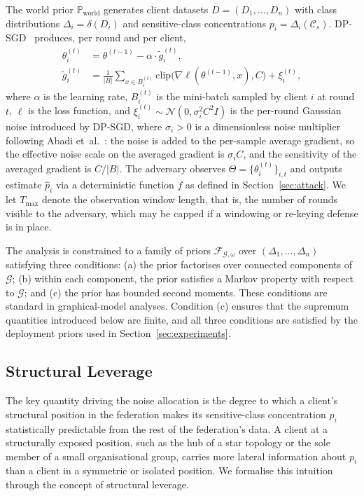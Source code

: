 \documentclass[letterpaper,journal]{IEEEtran}
\begin{document}
The world prior $\mathbb{P}_{\mathrm{world}}$ generates client
datasets $D = (D_1,\ldots,D_n)$ with class distributions $\Delta_i
= \delta(D_i)$ and sensitive-class concentrations $p_i =
\Delta_i(\mathcal{C}_s)$. DP-SGD~\cite{abadi2016dpsgd} produces,
per round and per client,
\begin{equation}
\begin{split}
\theta_i^{(t)} &= \theta^{(t-1)} - \alpha \cdot \tilde{g}_i^{(t)},\\
\tilde{g}_i^{(t)} &= \frac{1}{|B|}\sum_{x \in B_i^{(t)}}
\mathrm{clip}\bigl(\nabla\ell(\theta^{(t-1)},x), C\bigr)
+ \xi_i^{(t)},
\end{split}
\label{eq:dpsgd}
\end{equation}
where $\alpha$ is the learning rate, $B_i^{(t)}$ is the mini-batch
sampled by client $i$ at round $t$, $\ell$ is the loss function,
and $\xi_i^{(t)} \sim \mathcal{N}(0, \sigma_i^2 C^2 I)$ is the
per-round Gaussian noise introduced by DP-SGD, where $\sigma_i > 0$
is a dimensionless noise multiplier following Abadi
et~al.~\cite{abadi2016dpsgd}: the noise is added to the per-sample
average gradient, so the effective noise scale on the averaged
gradient is $\sigma_i C$, and the sensitivity of the averaged
gradient is $C/|B|$. The adversary observes $\Theta =
\{\theta_i^{(t)}\}_{i,t}$ and outputs estimate $\hat{p}_i$ via a
deterministic function $f$ as defined in
Section~\ref{sec:attack}. We let $T_{\max}$ denote the observation
window length, that is, the number of rounds visible to the
adversary, which may be capped if a windowing or re-keying defense
is in place.

The analysis is constrained to a family of priors
$\mathcal{F}_{\mathcal{G},\omega}$ over
$(\Delta_1,\ldots,\Delta_n)$ satisfying three conditions: (a) the
prior factorises over connected components of $\mathcal{G}$; (b)
within each component, the prior satisfies a Markov property with
respect to $\mathcal{G}$; and (c) the prior has bounded second
moments. These conditions are standard in graphical-model analyses.
Condition (c) ensures that the supremum quantities introduced below
are finite, and all three conditions are satisfied by the deployment
priors used in Section~\ref{sec:experiments}.

\subsection{Structural Leverage}
\label{sec:defense-leverage}

The key quantity driving the noise allocation is the degree to which
a client's structural position in the federation makes its
sensitive-class concentration $p_i$ statistically predictable from
the rest of the federation's data. A client at a structurally
exposed position, such as the hub of a star topology or the sole
member of a small organisational group, carries more lateral
information about $p_i$ than a client in a symmetric or isolated
position. We formalise this intuition through the concept of
structural leverage.
\end{document}
